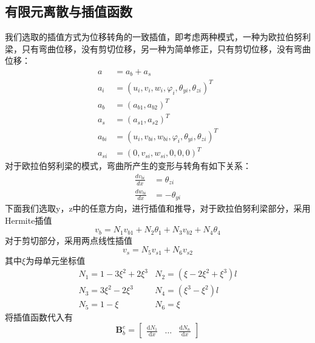 \documentclass[forprint]{WHUBachelor}
\begin{document}
\subsection{有限元离散与插值函数}
我们选取的插值方式为位移转角的一致插值，即考虑两种模式，一种为欧拉伯努利梁，只有弯曲位移，没有剪切位移，另一种为简单修正，只有剪切位移，没有弯曲位移：
\begin{equation} 
\begin{aligned} a &=a_{b}+a_{s} \\ a_{i} &=\left(u_{i}, v_{i}, w_{i}, \varphi_{i}, \theta_{y i}, \theta_{z i}\right)^{T} \\ a_{b} &=\left(a_{b 1}, a_{b 2}\right)^{T} \\ a_{s} &=\left(a_{s 1}, a_{s 2}\right)^{T} \\ a_{b i} &=\left(u_{i}, v_{b i}, w_{b i}, \varphi_{i}, \theta_{y i}, \theta_{z i}\right)^{T} \\ a_{s i} &=\left(0, v_{s i}, w_{s i}, 0,0,0\right)^{T} \end{aligned}
 \end{equation}
对于欧拉伯努利梁的模式，弯曲所产生的变形与转角有如下关系：
\begin{equation} 
\begin{aligned} \frac{d v_{b i}}{d x} &=\theta_{z i} \\ \frac{d w_{b i}}{d x} &=-\theta_{y i} \end{aligned}
 \end{equation}
下面我们选取y，z中的任意方向，进行插值和推导，对于欧拉伯努利梁部分，采用Hermite插值
\begin{equation} 
v_{b}=N_{1} v_{b 1}+N_{2} \theta_{1}+N_{3} v_{b 2}+N_{4} \theta_{4}
 \end{equation}
对于剪切部分，采用两点线性插值
\begin{equation} 
v_{s}=N_{5} v_{s 1}+N_{6} v_{s 2}
 \end{equation}
其中$\xi$为母单元坐标值
\begin{equation} 
\begin{array}{ll}{N_{1}=1-3 \xi^{2}+2 \xi^{3}} & {N_{2}=\left(\xi-2 \xi^{2}+\xi^{3}\right)}l \\ {N_{3}=3 \xi^{2}-2 \xi^{3}} & {N_{4}=\left(\xi^{3}-\xi^{2}\right) l} \\ {N_{5}=1-\xi} & {N_{6}=\xi}\end{array}
 \end{equation}
将插值函数代入有
\begin{equation} 
\boldsymbol{B}_{b}^{e}=\left[\begin{array}{ccc} \frac{\mathrm{d} N_{1}}{\mathrm{d} x} & \ldots & \frac{\mathrm{d} N_{n}}{\mathrm{d} x}\end{array}\right]
 \end{equation}
\end{document}
